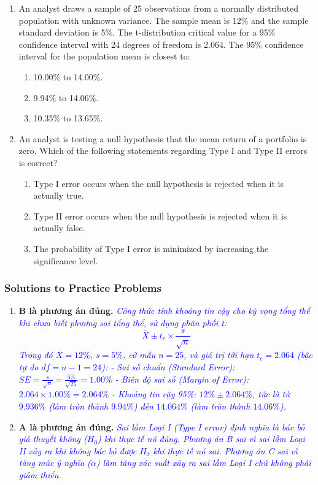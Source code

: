 \begin{enumerate}
	\item An analyst draws a sample of 25 observations from a normally distributed population with unknown variance. The sample mean is 12\% and the sample standard deviation is 5\%. The t-distribution critical value for a 95\% confidence interval with 24 degrees of freedom is 2.064. The 95\% confidence interval for the population mean is closest to:
	      \begin{enumerate}[label=\Alph*.]
		      \item 10.00\% to 14.00\%.
		      \item 9.94\% to 14.06\%.
		      \item 10.35\% to 13.65\%.
	      \end{enumerate}

	\item An analyst is testing a null hypothesis that the mean return of a portfolio is zero. Which of the following statements regarding Type I and Type II errors is correct?
	      \begin{enumerate}[label=\Alph*.]
		      \item Type I error occurs when the null hypothesis is rejected when it is actually true.
		      \item Type II error occurs when the null hypothesis is rejected when it is actually false.
		      \item The probability of Type I error is minimized by increasing the significance level.
	      \end{enumerate}
\end{enumerate}

\subsubsection{Solutions to Practice Problems}
\label{subsec:app_Solutions_M7}

\begin{enumerate}
	\item \textbf{B là phương án đúng.} \textcolor{blue}{\textit{Công thức tính khoảng tin cậy cho kỳ vọng tổng thể khi chưa biết phương sai tổng thể, sử dụng phân phối t:
	      \[
	      \bar{X} \pm t_c \times \frac{s}{\sqrt{n}}
	      \]
	      Trong đó $\bar{X} = 12\%$, $s = 5\%$, cỡ mẫu $n = 25$, và giá trị tới hạn $t_c = 2.064$ (bậc tự do $df = n - 1 = 24$):
	      - Sai số chuẩn (Standard Error): $SE = \frac{s}{\sqrt{n}} = \frac{5\%}{\sqrt{25}} = 1.00\%$
	      - Biên độ sai số (Margin of Error): $2.064 \times 1.00\% = 2.064\%$
	      - Khoảng tin cậy 95\%: $12\% \pm 2.064\%$, tức là từ $9.936\%$ (làm tròn thành $9.94\%$) đến $14.064\%$ (làm tròn thành $14.06\%$).}}

	\item \textbf{A là phương án đúng.} \textcolor{blue}{\textit{Sai lầm Loại I (Type I error) định nghĩa là bác bỏ giả thuyết không ($H_0$) khi thực tế nó đúng.
	      Phương án B sai vì sai lầm Loại II xảy ra khi không bác bỏ được $H_0$ khi thực tế nó sai. Phương án C sai vì tăng mức ý nghĩa ($\alpha$) làm tăng xác suất xảy ra sai lầm Loại I chứ không phải giảm thiểu.}}
\end{enumerate}

